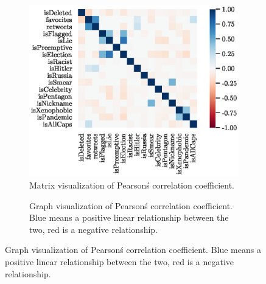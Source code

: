 \documentclass{article}
\begin{document}
    \begin{figure}
         \vspace{-2cm}
         \begin{subfigure}{\textwidth}
             \hspace{-3.3cm}
             \includegraphics{corr_heatmap.eps}
             \caption{Matrix visualization of Pearson\'s correlation coefficient.}
         \end{subfigure}
         \vspace{2cm}
         \begin{subfigure}{\textwidth}
             
             \caption{Graph visualization of Pearson\'s correlation coefficient. Blue means a positive linear relationship between the two, red is a negative relationship.}
         \end{subfigure}
    \end{figure}
\end{document}
